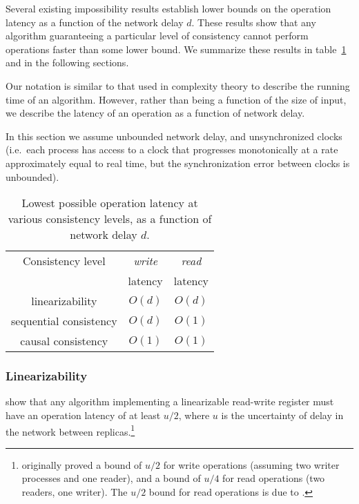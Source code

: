 \documentclass[fleqn,12pt,lineno]{wlpeerj} %
\begin{document}
Several existing impossibility results establish lower bounds on the operation latency as a function
of the network delay $d$. These results show that any algorithm guaranteeing a particular level of
consistency cannot perform operations faster than some lower bound. We summarize these results in
table~\ref{tab:op-latency} and in the following sections.

Our notation is similar to that used in complexity theory to describe the running time of an
algorithm. However, rather than being a function of the size of input, we describe the latency of an
operation as a function of network delay.

In this section we assume unbounded network delay, and unsynchronized clocks (i.e.\ each process has
access to a clock that progresses monotonically at a rate approximately equal to real time, but the
synchronization error between clocks is unbounded).

\begin{table}
    \centering
    \begin{tabular}{ccc}
        Consistency level      & \textit{write} & \textit{read} \\
                               & latency        & latency \\[3pt] \hline \noalign{\vspace{6pt}}
        linearizability        & $O(d)$         & $O(d)$  \\[3pt]
        sequential consistency & $O(d)$         & $O(1)$  \\[3pt]
        causal consistency     & $O(1)$         & $O(1)$  \\[3pt] \hline
    \end{tabular}
    \caption{Lowest possible operation latency at various consistency levels, as a function of
    network delay $d$.}
    \label{tab:op-latency}
\end{table}

\subsubsection{Linearizability}

\citet{Attiya1994gw} show that any algorithm implementing a linearizable read-write
register must have an operation latency of at least $u/2$, where $u$ is the uncertainty of delay in
the network between replicas.\footnote{\citet{Attiya1994gw} originally proved a
bound of $u/2$ for write operations (assuming two writer processes and one reader), and a bound of
$u/4$ for read operations (two readers, one writer). The $u/2$ bound for read operations is due to
\citet{Mavronicolas1999eb}.}
\end{document}
